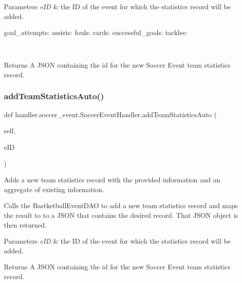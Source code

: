 \begin{DoxyParams}{Parameters}
{\em e\+ID} & the ID of the event for which the statistics record will be added. \begin{DoxyVerb}           goal_attempts:
           assists:
           fouls:
           cards:
           successful_goals:
           tackles:
\end{DoxyVerb}
\\
\hline
\end{DoxyParams}
\begin{DoxyReturn}{Returns}
A J\+S\+ON containing the id for the new Soccer Event team statistics record. 
\end{DoxyReturn}
\mbox{\label{classhandler_1_1soccer__event_1_1_soccer_event_handler_a7efe15076e99de5236ae8b4be54ebaa0}} 
\subsubsection{\texorpdfstring{add\+Team\+Statistics\+Auto()}{addTeamStatisticsAuto()}}
{\footnotesize\ttfamily def handler.\+soccer\+\_\+event.\+Soccer\+Event\+Handler.\+add\+Team\+Statistics\+Auto (\begin{DoxyParamCaption}\item[{}]{self,  }\item[{}]{e\+ID }\end{DoxyParamCaption})}



Adds a new team statistics record with the provided information and an aggregate of existing information. 

Calls the Bastketball\+Event\+D\+AO to add a new team statistics record and maps the result to to a J\+S\+ON that contains the desired record. That J\+S\+ON object is then returned.


\begin{DoxyParams}{Parameters}
{\em e\+ID} & the ID of the event for which the statistics record will be added.\\
\hline
\end{DoxyParams}
\begin{DoxyReturn}{Returns}
A J\+S\+ON containing the id for the new Soccer Event team statistics record. 
\end{DoxyReturn}
\mbox{\label{classhandler_1_1soccer__event_1_1_soccer_event_handler_ad48fd75bebcc1203dea9abd9e9f8f8f8}} 
